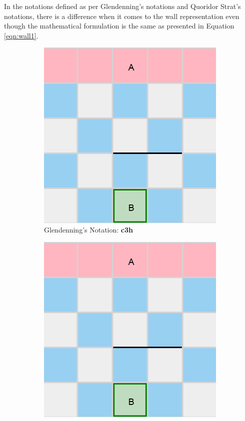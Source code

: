 In the notations defined as per Glendenning's notations and Quoridor Strat's notations, there is a difference when it comes to the wall representation even though the mathematical formulation is the same as presented in Equation \eqref{eqn:wall1}. 

\begin{figure}[!ht]
    \begin{subfigure}{0.4\textwidth}
      \includegraphics[width=\textwidth]{../img/GameBoard/wall_repr.png}
      \caption{Glendenning's Notation: \textbf{c3h}}
      \label{fig:NotationDifferentA}
    \end{subfigure}
    \hfill
    \begin{subfigure}{0.4\textwidth}
      \includegraphics[width=\textwidth]{../img/GameBoard/wall_repr.png}

\end{subfigure}
\end{figure}

